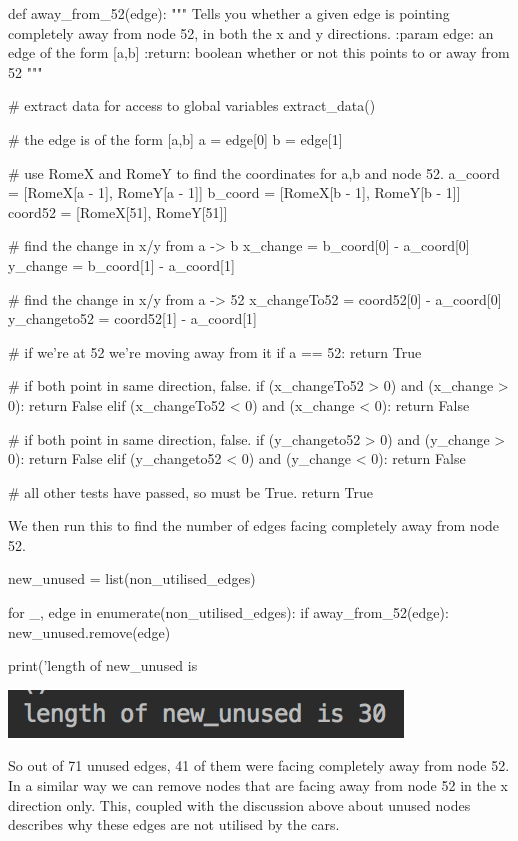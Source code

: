 \documentclass[paper=a4, fontsize=12pt]{scrartcl} %
\numberwithin{equation}{section}       %
\numberwithin{figure}{section}         %
\numberwithin{table}{section}          %
\begin{document}
\begin{python}
def away_from_52(edge):
    """
    Tells you whether a given edge is pointing completely away from
    node 52, in both the x and y directions.
    :param edge: an edge of the form [a,b]
    :return: boolean whether or not this points to or away from 52
    """

    # extract data for access to global variables
    extract_data()

    # the edge is of the form [a,b]
    a = edge[0]
    b = edge[1]

    # use RomeX and RomeY to find the coordinates for a,b and node 52.
    a_coord = [RomeX[a - 1], RomeY[a - 1]]
    b_coord = [RomeX[b - 1], RomeY[b - 1]]
    coord52 = [RomeX[51], RomeY[51]]

    # find the change in x/y from a -> b
    x_change = b_coord[0] - a_coord[0]
    y_change = b_coord[1] - a_coord[1]

    # find the change in x/y from a -> 52
    x_changeTo52 = coord52[0] - a_coord[0]
    y_changeto52 = coord52[1] - a_coord[1]

    # if we're at 52 we're moving away from it
    if a == 52:
        return True

    # if both point in same direction, false.
    if (x_changeTo52 > 0) and (x_change > 0):
        return False
    elif (x_changeTo52 < 0) and (x_change < 0):
        return False

    # if both point in same direction, false.
    if (y_changeto52 > 0) and (y_change > 0):
        return False
    elif (y_changeto52 < 0) and (y_change < 0):
        return False

    # all other tests have passed, so must be True.
    return True  
\end{python}

We then run this to find the number of edges facing completely away from node 52.

\begin{python}
new_unused = list(non_utilised_edges)

for _, edge in enumerate(non_utilised_edges):
	if away_from_52(edge):
	new_unused.remove(edge)

print('length of new_unused is %
\end{python}

\includegraphics{new_unused}

So out of 71 unused edges, 41 of them were facing completely away from node 52. In a similar way we can remove nodes that are facing away from node 52 in the x direction only. This, coupled with the discussion above about unused nodes describes why these edges are not utilised by the cars.
\end{document}
